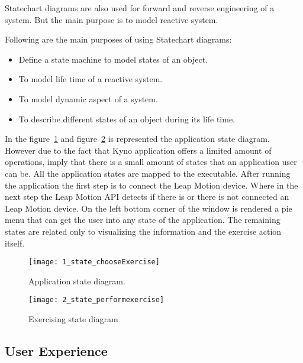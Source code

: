 Statechart diagrams are also used for forward and reverse engineering of a system. But the main purpose is to model reactive system.


Following are the main purposes of using Statechart diagrams:

\begin{itemize}
\item Define a state machine to model states of an object.
\item To model life time of a reactive system.
\item To model dynamic aspect of a system.
\item To describe different states of an object during its life time.
\end{itemize}

\vspace{0.2cm}

In the  \mbox{figure \ref{state_choose}} and  \mbox{figure \ref{state_perform}} is represented the application state diagram.
 However due to the fact that Kyno application offers a limited amount of operations, imply that there is a small amount of states that an application user can be. All the application states are mapped to the executable. After running the application the first step is to connect the Leap Motion device. Where in the next step the Leap Motion API detects if there is or there is not connected an Leap Motion device. On the left bottom corner of the window is rendered a pie menu that can get the user into any state of the application. The remaining states are related only to visualizing the information and the exercise action itself.


\begin{figure}[!h]
\centering
\texttt{[image: 1\_state\_chooseExercise]}
\caption{Application state diagram.}\label{state_choose}
\end{figure}
\newpage

\begin{figure}[!h]
\centering
\texttt{[image: 2\_state\_performexercise]}
\caption{Exercising state diagram}\label{state_perform}
\end{figure}



\subsection{User Experience}


\clearpage
